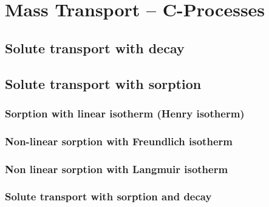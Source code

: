 \chapter{Mass Transport -- C-Processes}




\section{Solute transport with decay}
\label{sec:decay}





\section{Solute transport with sorption}



\subsection{Sorption with linear isotherm (Henry isotherm)}



\subsection{Non-linear sorption with Freundlich isotherm}



\subsection{Non linear sorption with Langmuir isotherm}



\subsection{Solute transport with sorption and decay}


